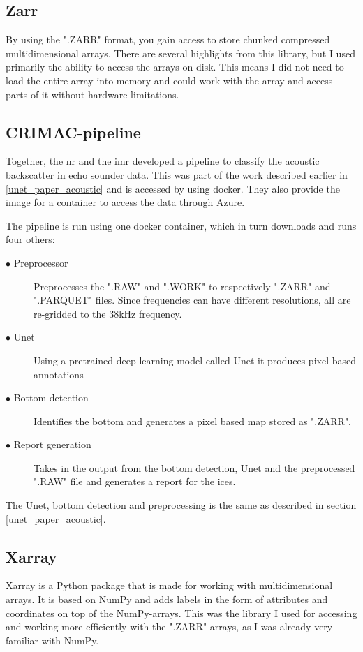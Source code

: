     \subsection{Zarr}
        By using the ".ZARR" \cite{zarr} format, you gain access to store chunked compressed  multidimensional arrays. There are several highlights from this library, but I used primarily the ability to access the arrays on disk. This means I did not need to load the entire array into memory and could work with the array and access parts of it without hardware limitations.
        
    \subsection{CRIMAC-pipeline} \label{CRIMAC-pipeline}
        Together, the \gls{nr} and the \gls{imr} developed a pipeline\cite{crimac_pipeline} to classify the acoustic backscatter in echo sounder data. This was part of the work described earlier in \ref{unet_paper_acoustic} and is accessed by using docker. They also provide the image for a container to access the data through Azure.
        
        The pipeline is run using one docker container, which in turn downloads and runs four others:
        
            \begin{description}
              \item[$\bullet$ Preprocessor] Preprocesses the ".RAW" and ".WORK" to respectively ".ZARR" and ".PARQUET" files. Since frequencies can have different resolutions, all are re-gridded to the 38kHz frequency.
              \item[$\bullet$ Unet] Using a pretrained deep learning model called Unet it produces pixel based annotations
              \item[$\bullet$ Bottom detection] Identifies the bottom and generates a pixel based map stored as ".ZARR".
              \item[$\bullet$ Report generation] Takes in the output from the bottom detection, Unet and the preprocessed ".RAW" file and generates a report for the \gls{ices}.
    
            \end{description}
        
        The Unet, bottom detection and preprocessing is the same as described in section \ref{unet_paper_acoustic}.

    \subsection{Xarray}
        Xarray\cite{xarray} is a Python package that is made for working with multidimensional arrays. It is based on NumPy and adds labels in the form of attributes and coordinates on top of the NumPy-arrays. This was the library I used for accessing and working more efficiently with the ".ZARR" arrays, as I was already very familiar with NumPy.


